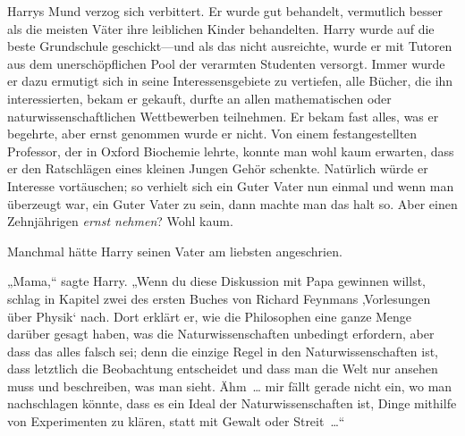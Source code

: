 Harrys Mund verzog sich verbittert. Er wurde gut behandelt, vermutlich besser als die meisten Väter ihre leiblichen Kinder behandelten. Harry wurde auf die beste Grundschule geschickt—und als das nicht ausreichte, wurde er mit Tutoren aus dem unerschöpflichen Pool der verarmten Studenten versorgt. Immer wurde er dazu ermutigt sich in seine Interessensgebiete zu vertiefen, alle Bücher, die ihn interessierten, bekam er gekauft, durfte an allen mathematischen oder naturwissenschaftlichen Wettbewerben teilnehmen. Er bekam fast alles, was er begehrte, aber ernst genommen wurde er nicht. Von einem festangestellten Professor, der in Oxford Biochemie lehrte, konnte man wohl kaum erwarten, dass er den Ratschlägen eines kleinen Jungen Gehör schenkte. Natürlich würde er Interesse vortäuschen; so verhielt sich ein Guter Vater nun einmal und wenn man überzeugt war, ein Guter Vater zu sein, dann machte man das halt so. Aber einen Zehnjährigen \emph{ernst nehmen}? Wohl kaum.

Manchmal hätte Harry seinen Vater am liebsten angeschrien.

„Mama,“ sagte Harry. „Wenn du diese Diskussion mit Papa gewinnen willst, schlag in Kapitel zwei des ersten Buches von Richard Feynmans ‚Vorlesungen über Physik‘ nach. Dort erklärt er, wie die Philosophen eine ganze Menge darüber gesagt haben, was die Naturwissenschaften unbedingt erfordern, aber dass das alles falsch sei; denn die einzige Regel in den Naturwissenschaften ist, dass letztlich die Beobachtung entscheidet und dass man die Welt nur ansehen muss und beschreiben, was man sieht. Ähm … mir fällt gerade nicht ein, wo man nachschlagen könnte, dass es ein Ideal der Naturwissenschaften ist, Dinge mithilfe von Experimenten zu klären, statt mit Gewalt oder Streit …“

